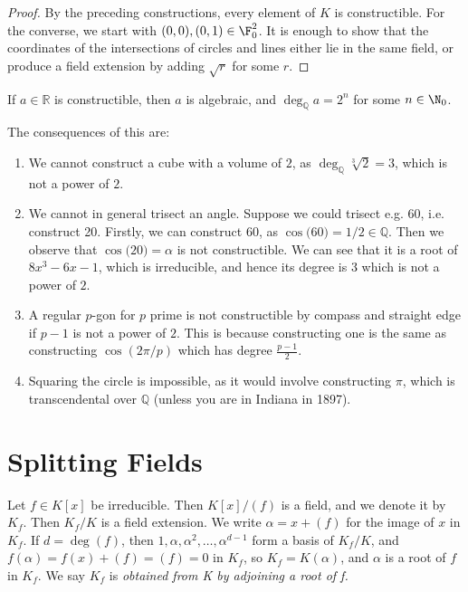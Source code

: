 \documentclass[a4paper, 10pt, twocolumn]{amsart}
\begin{document}
\begin{proof}
By the preceding constructions, every element of $K$ is constructible. For the converse, we start with $(0,0), (0,1) \in \F_0^2$. It is enough to show that the coordinates of the intersections of circles and lines either lie in the same field, or produce a field extension by adding $\sqrt{r}$ for some $r$.
\end{proof}

\begin{corollary}
If $a \in \mathbb{R}$ is constructible, then $a$ is algebraic, and $\deg_{\mathbb{Q}} a = 2^n$ for some $n\in \N_{0}$.
\end{corollary}

The consequences of this are:
\begin{enumerate}
\item We cannot construct a cube with a volume of $2$, as $\deg_{\mathbb{Q}} \sqrt[3]{2} = 3$, which is not a power of $2$.
\item We cannot in general trisect an angle. Suppose we could trisect e.g. 60\textdegree, i.e. construct 20\textdegree. Firstly, we can construct 60\textdegree, as $\cos(60$\textdegree$) = 1/2 \in \mathbb{Q}$. Then we observe that $\cos(20$\textdegree$) = \alpha$ is not constructible. We can see that it is a root of $8x^3 - 6x - 1$, which is irreducible, and hence its degree is $3$ which is not a power of $2$.
\item A regular $p$-gon for $p$ prime is not constructible by compass and straight edge if $p-1$ is not a power of $2$. This is because constructing one is the same as constructing $\cos(2\pi/p)$ which has degree $\frac{p-1}{2}$.
\item Squaring the circle is impossible, as it would involve constructing $\pi$, which is transcendental over $\mathbb{Q}$ (unless you are in Indiana in 1897).
\end{enumerate}
\section{Splitting Fields}
Let $f\in K[x]$ be irreducible. Then $K[x]/(f)$ is a field, and we denote it by $K_f$. Then $K_f/K$ is a field extension. We write $\alpha = x+(f)$ for the image of $x$ in $K_f$. If $d = \deg(f)$, then $1, \alpha, \alpha^2, \ldots, \alpha^{d-1}$ form a basis of $K_f/K$, and $f(\alpha) = f(x) + (f) = (f) = 0$ in $K_f$, so $K_f = K(\alpha)$, and $\alpha$ is a root of $f$ in $K_f$. We say $K_f$ is \emph{obtained from K by adjoining a root of f.}
\end{document}
